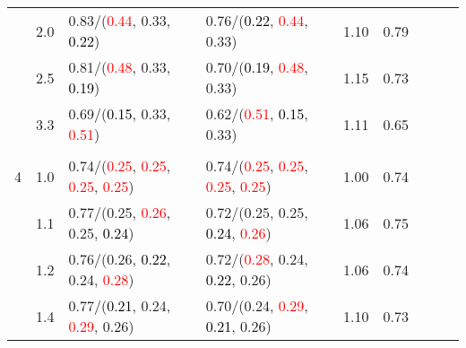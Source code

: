 \documentclass[10pt,a4paper]{report}
\begin{document}
\begin{table}[!htbp]
\begin{center}
{\begin{tabular}{ccllccccc}
				  & 2.0                               & 0.83/(\textcolor{red}{0.44}, 0.33, \textcolor{black}{0.22})                                       & 0.76/(\textcolor{black}{0.22}, \textcolor{red}{0.44}, 0.33)                                       & 1.10             & 0.79                     \\
				  & 2.5                               & 0.81/(\textcolor{red}{0.48}, 0.33, \textcolor{black}{0.19})                                       & 0.70/(\textcolor{black}{0.19}, \textcolor{red}{0.48}, 0.33)                                       & 1.15             & 0.73                     \\
				  & 3.3                               & 0.69/(\textcolor{black}{0.15}, 0.33, \textcolor{red}{0.51})                                       & 0.62/(\textcolor{red}{0.51}, \textcolor{black}{0.15}, 0.33)                                       & 1.11             & 0.65                     \\
				  &                                   &                                                                                                   &                                                                                                   &                                             \\
				4 & 1.0                               & 0.74/(\textcolor{red}{0.25}, \textcolor{red}{0.25}, \textcolor{red}{0.25}, \textcolor{red}{0.25}) & 0.74/(\textcolor{red}{0.25}, \textcolor{red}{0.25}, \textcolor{red}{0.25}, \textcolor{red}{0.25}) & 1.00             & 0.74                     \\
				  & 1.1                               & 0.77/(0.25, \textcolor{red}{0.26}, 0.25, \textcolor{black}{0.24})                                 & 0.72/(0.25, 0.25, \textcolor{black}{0.24}, \textcolor{red}{0.26})                                 & 1.06             & 0.75                     \\
				  & 1.2                               & 0.76/(0.26, \textcolor{black}{0.22}, 0.24, \textcolor{red}{0.28})                                 & 0.72/(\textcolor{red}{0.28}, 0.24, \textcolor{black}{0.22}, 0.26)                                 & 1.06             & 0.74                     \\
				  & 1.4                               & 0.77/(\textcolor{black}{0.21}, 0.24, \textcolor{red}{0.29}, 0.26)                                 & 0.70/(0.24, \textcolor{red}{0.29}, \textcolor{black}{0.21}, 0.26)                                 & 1.10             & 0.73                     \\

\end{tabular}}
\end{center}
\end{table}
\end{document}
